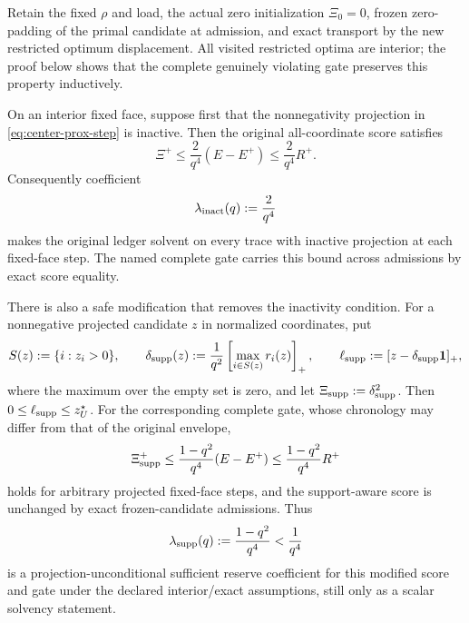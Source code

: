\begin{proposition}
\label{prop:consumed-reserve-quartic-projection}
Retain the fixed $\rho$ and load, the actual zero initialization
$\Xi_0=0$, frozen zero-padding of the primal candidate at admission, and exact
transport by the new restricted optimum displacement.  All visited restricted
optima are interior; the proof below shows that the complete genuinely
violating gate preserves this property inductively.

On an interior fixed face, suppose first that the nonnegativity projection in
\cref{eq:center-prox-step} is inactive.  Then the original all-coordinate
score satisfies
\begin{equation}
 \Xi^+\leq \frac{2}{q^4}(E-E^+)
          \leq \frac{2}{q^4}R^+.
 \label{eq:inactive-projection-quartic-reserve}
\end{equation}
Consequently coefficient
\begin{equation}
 \lambda_{\rm inact}(q):=\frac{2}{q^4}
 \label{eq:inactive-projection-quartic-coefficient}
\end{equation}
makes the original ledger solvent on every trace with inactive projection at
each fixed-face step.  The named complete gate carries this bound across
admissions by exact score equality.

There is also a safe modification that removes the inactivity condition.  For
a nonnegative projected candidate $z$ in normalized coordinates, put
\begin{equation}
 S(z):=\{i:z_i>0\},\qquad
 \delta_{\rm supp}(z)
 :=\frac1{q^2}\left[\max_{i\in S(z)}r_i(z)\right]_+,
 \qquad
 \ell_{\rm supp}:=[z-\delta_{\rm supp}\mathbf{1}]_+,
 \label{eq:support-aware-envelope}
\end{equation}
where the maximum over the empty set is zero, and let
$\Xi_{\rm supp}:=\delta_{\rm supp}^2$.  Then
$0\leq\ell_{\rm supp}\leq z_U^\star$.  For the corresponding complete gate,
whose chronology may differ from that of the original envelope,
\begin{equation}
 \Xi_{\rm supp}^+
 \leq\frac{1-q^2}{q^4}(E-E^+)
 \leq\frac{1-q^2}{q^4}R^+
 \label{eq:support-aware-quartic-reserve}
\end{equation}
holds for arbitrary projected fixed-face steps, and the support-aware score is
unchanged by exact frozen-candidate admissions.  Thus
\begin{equation}
 \lambda_{\rm supp}(q):=\frac{1-q^2}{q^4}<\frac1{q^4}
 \label{eq:support-aware-quartic-coefficient}
\end{equation}
is a projection-unconditional sufficient reserve coefficient for this
modified score and gate under the declared interior/exact assumptions, still
only as a scalar solvency statement.


\end{proposition}
